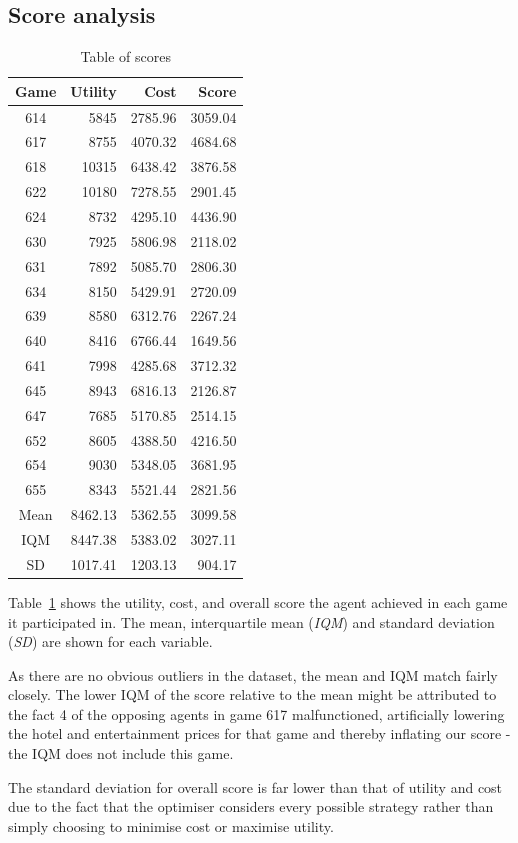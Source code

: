 \documentclass[a4paper]{proc}
\begin{document}
\subsection{Score analysis}

\begin{table}
  \caption{Table of scores}
  \label{tab:scores}
  \center
  \begin{tabular}{ c | r r r }
    Game & Utility & Cost    & Score   \\
    \hline
    614  & 5845    & 2785.96 & 3059.04 \\
    617  & 8755    & 4070.32 & 4684.68 \\
    618  & 10315   & 6438.42 & 3876.58 \\
    622  & 10180   & 7278.55 & 2901.45 \\
    624  & 8732    & 4295.10 & 4436.90 \\
    630  & 7925    & 5806.98 & 2118.02 \\
    631  & 7892    & 5085.70 & 2806.30 \\
    634  & 8150    & 5429.91 & 2720.09 \\
    639  & 8580    & 6312.76 & 2267.24 \\
    640  & 8416    & 6766.44 & 1649.56 \\
    641  & 7998    & 4285.68 & 3712.32 \\
    645  & 8943    & 6816.13 & 2126.87 \\
    647  & 7685    & 5170.85 & 2514.15 \\
    652  & 8605    & 4388.50 & 4216.50 \\
    654  & 9030    & 5348.05 & 3681.95 \\
    655  & 8343    & 5521.44 & 2821.56 \\
    \hline
    Mean & 8462.13 & 5362.55 & 3099.58 \\
    IQM  & 8447.38 & 5383.02 & 3027.11 \\
    SD   & 1017.41 & 1203.13 &  904.17 \\
  \end{tabular}
\end{table}

Table~\ref{tab:scores} shows the utility, cost, and overall score the agent achieved in each game it participated in. The mean, interquartile mean (\emph{IQM}) and standard deviation (\emph{SD}) are shown for each variable.

As there are no obvious outliers in the dataset, the mean and IQM match fairly closely. The lower IQM of the score relative to the mean might be attributed to the fact 4 of the opposing agents in game 617 malfunctioned, artificially lowering the hotel and entertainment prices for that game and thereby inflating our score - the IQM does not include this game.

The standard deviation for overall score is far lower than that of utility and cost due to the fact that the optimiser considers every possible strategy rather than simply choosing to minimise cost or maximise utility.

\printbibliography
\end{document}
